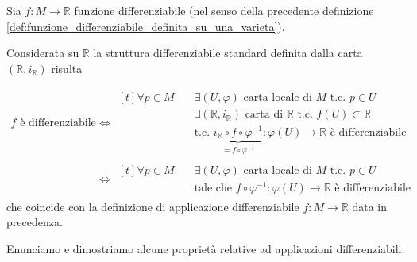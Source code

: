 \begin{center}
        \end{center}
        \newpage
        \begin{osservazione}
        \mbox{}

        Sia $f \colon M \to \mathbb{R}$ funzione differenziabile (nel senso della precedente definizione \textcolor{violet}{\ref{def:funzione_differenziabile_definita_su_una_varieta}}). 
        
        Considerata su $\mathbb{R}$ la struttura differenziabile standard definita dalla carta $(\mathbb{R}, i_{\mathbb{R}})$ risulta

        \[
        \begin{aligned}
        f \text{ è differenziabile} &\iff
        \begin{aligned}[t]
        \forall p \in M \quad & \exists (U, \varphi) \text{ carta locale di $M$ t.c. } p \in U \\ 
        &\exists (\mathbb{R}, i_{\mathbb{R}}) \text{ carta di } \mathbb{R} \text{ t.c. } f(U) \subset \mathbb{R} \\
        &\text{t.c. } \underbrace{i_{\mathbb{R}} \circ f \circ \varphi^{-1}}_{= f \circ \varphi^{-1}} \colon \varphi(U) \to \mathbb{R} \text{ è differenziabile}
        \end{aligned} \\[1.2em] 
        &\iff 
        \begin{aligned}[t] 
        \forall p \in M \quad & \exists (U, \varphi) \text{ carta locale di } M \text{ t.c. } p \in U \\
        &\text{tale che } f \circ \varphi^{-1} \colon \varphi(U) \to \mathbb{R} \text{ è differenziabile}
        \end{aligned}
        \end{aligned}
        \]
        che coincide con la definizione di applicazione differenziabile $f \colon M \to \mathbb{R}$ data in precedenza.
        \end{osservazione}
        \newpage
        Enunciamo e dimostriamo alcune proprietà relative ad applicazioni differenziabili:

